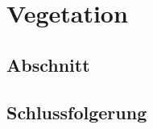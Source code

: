 %
%
%
\chapter{Vegetation\label{chapter:vegetation}}
\begin{refsection}

\section{Abschnitt}

\section{Schlussfolgerung}

\printbibliography[heading=subbibliography]
\end{refsection}
